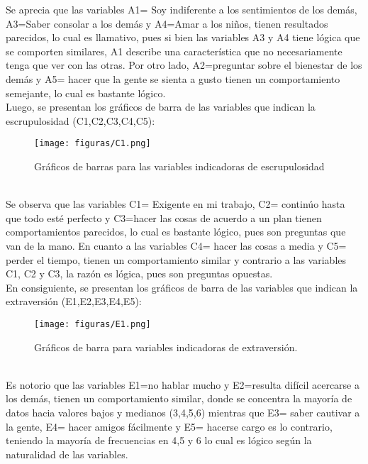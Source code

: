 \documentclass{report}
\begin{document}
Se aprecia que las variables A1= Soy indiferente a los sentimientos de los demás, A3=Saber consolar a los demás y A4=Amar a los niños, tienen resultados parecidos, lo cual es llamativo, pues si bien las variables A3 y A4 tiene lógica que se comporten similares, A1 describe una característica que no necesariamente tenga que ver con las otras. Por otro lado, A2=preguntar sobre el bienestar de los demás y A5= hacer que la gente se sienta a gusto tienen un comportamiento semejante, lo cual es bastante lógico.\\

Luego, se presentan los gráficos de barra de las variables que indican la escrupulosidad (C1,C2,C3,C4,C5):\\
\vspace{3cm}

\begin{figure}[htp]
        \centering
    	\texttt{[image: figuras/C1.png]}
    	\caption{Gráficos de barras para las variables indicadoras de escrupulosidad}
    	\label{fig: Figura1}
\end{figure}\\

Se observa que las variables C1= Exigente en mi trabajo, C2= continúo hasta que todo esté perfecto y C3=hacer las cosas de acuerdo a un plan tienen comportamientos parecidos, lo cual es bastante lógico, pues son preguntas que van de la mano. En cuanto a las variables C4= hacer las cosas a media y C5= perder el tiempo, tienen un comportamiento similar y contrario a las variables C1, C2 y C3, la razón es lógica, pues son preguntas opuestas.\\

En consiguiente, se presentan los gráficos de barra de las variables que indican la extraversión (E1,E2,E3,E4,E5):\\
\begin{figure}[htp]
        \centering
    	\texttt{[image: figuras/E1.png]}
    	\caption{Gráficos de barra para variables indicadoras de extraversión.}
    	\label{fig: Figura1}
\end{figure}\\

Es notorio que las variables E1=no hablar mucho y E2=resulta difícil acercarse a los demás, tienen un comportamiento similar, donde se concentra la mayoría de datos hacia valores bajos y medianos (3,4,5,6) mientras que E3= saber cautivar a la gente, E4= hacer amigos fácilmente y E5= hacerse cargo es lo contrario, teniendo la mayoría de frecuencias en 4,5 y 6 lo cual es lógico según la naturalidad de las variables.\\
\end{document}

